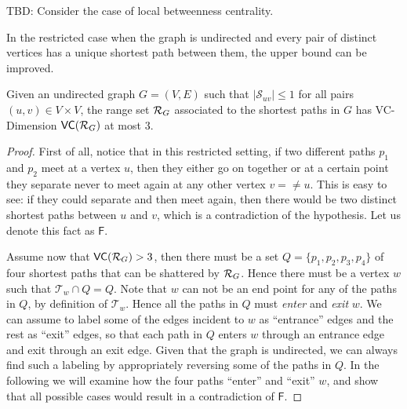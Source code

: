 \XXX TBD: Consider the case of local betweenness centrality. \MR

In the restricted case when the graph is undirected and every pair of distinct vertices
has a unique shortest path between them, the upper bound can be improved.
\begin{lemma}\label{lem:vcdimuppboundunique}
  Given an undirected graph $G=(V,E)$ such that $|\mathcal{S}_{uv}|\le1$ for all
  pairs $(u,v)\in V\times V$, the range set $\mathcal{R}_G$ associated to the
  shortest paths in $G$ has VC-Dimension $\mathsf{VC}(\mathcal{R}_G)$ at most $3$.
\end{lemma}

\begin{proof}
  First of all, notice that in this restricted setting, if two different paths
  $p_1$ and $p_2$ meet at a vertex $u$, then they either go on together or at a
  certain point they separate never to meet again at any other vertex $v=\neq u$.
  This is easy to see: if they could separate and then meet again, then there
  would be two distinct shortest paths between $u$ and $v$, which is a
  contradiction of the hypothesis. Let us denote this fact as $\mathsf{F}$.

  Assume now that $\mathsf{VC}(\mathcal{R}_G)>3$, then there must be a set
  $Q=\{p_1,p_2,p_3,p_4\}$ of four shortest paths that can be shattered by
  $\mathcal{R}_G$. Hence there must be a vertex $w$ such that $\mathcal{T}_{w}\cap
  Q=Q$. Note that $w$ can not be an end point for any of the paths in $Q$, by
  definition of $\mathcal{T}_w$. Hence all the paths in $Q$ must \emph{enter}
  and \emph{exit} $w$. We can assume to label some of the edges incident to $w$
  as ``entrance'' edges and the rest as ``exit'' edges, so that each path in $Q$
  enters $w$ through an entrance edge and exit through an exit edge. Given that
  the graph is undirected, we can always find such a labeling by appropriately
  reversing some of the paths in $Q$. In the following we will examine how the
  four paths ``enter'' and ``exit'' $w$, and show that all possible cases would
  result in a contradiction of $\mathsf{F}$. 


\end{proof}
